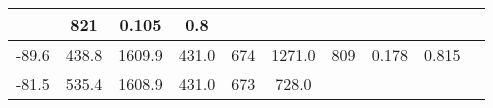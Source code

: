 \documentclass[a4paper,10pt]{article}
\begin{document}
\begin{longtable}{
     |
%    
    c|
%    
    c|
%    
    c|
%    
    c|
%    
    c|
%    
    c|
%    
    c|
%    
    c|
%    
    c|
%    
    c|
%    
    }
%        
        & 821
%        

%        

%        
        & 0.105
%        

%        

%        
        & 0.8
%        

%        
        \\
        \hline

        

%        

%        
        -89.6
%        

%        

%        
        & 438.8
%        

%        

%        
        & 1609.9
%        

%        

%        
        & 431.0
%        

%        

%        
        & 674
%        

%        

%        
        & 1271.0
%        

%        

%        
        & 809
%        

%        

%        
        & 0.178
%        

%        

%        
        & 0.815
%        

%        
        \\
        \hline

        

%        

%        
        -81.5
%        

%        

%        
        & 535.4
%        

%        

%        
        & 1608.9
%        

%        

%        
        & 431.0
%        

%        

%        
        & 673
%        

%        

%        
        & 728.0
%        

%        


\end{longtable}
\end{document}
